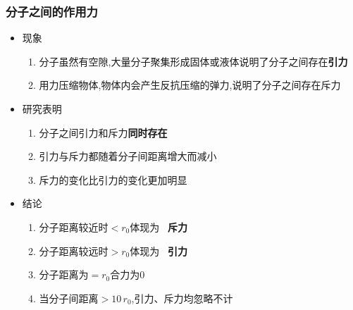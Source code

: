 \documentclass{article}
\begin{document}
\vspace{2em}

\subsubsection{分子之间的作用力}
\begin{itemize}
    \item 现象
          \begin{enumerate}[label = (\arabic*)]
              \item 分子虽然有空隙,大量分子聚集形成固体或液体说明了分子之间存在\textbf{引力}
              \item 用力压缩物体,物体内会产生反抗压缩的弹力,说明了分子之间存在斥力
          \end{enumerate}
    \item 研究表明
          \begin{enumerate}[label = (\arabic*)]
              \item 分子之间引力和斥力\textbf{同时存在}
              \item 引力与斥力都随着分子间距离增大而减小
              \item 斥力的变化比引力的变化更加明显
          \end{enumerate}
    \item 结论
          \begin{enumerate}[label = (\arabic*)]
              \item 分子距离较近时$<r_{0}$体现为 \, \textbf{斥力}
              \item 分子距离较远时$>r_{0}$体现为 \, \textbf{引力}
              \item 分子距离为$=r_{0}$合力为$0$
              \item 当分子间距离$>10 \, r_{0}$,引力、斥力均忽略不计
          \end{enumerate}

\end{itemize}

\vspace{2em}
\end{document}
